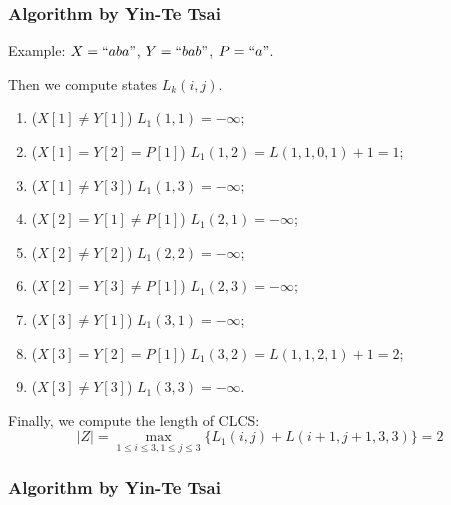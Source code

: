 \documentclass[10pt]{beamer}
\begin{document}
\begin{frame}
  \frametitle{Algorithm by Yin-Te Tsai}
Example: $X=``aba"$, $Y=``bab"$, $P=``a"$.

Then we compute states $L_k(i,j)$.

\begin{enumerate}
	\item<2-> ($X[1]\neq Y[1]$) $L_{1}(1,1) = -\infty$;
	\item<3-> ($X[1]=Y[2]=P[1]$) $L_{1}(1,2)=L(1,1,0,1) + 1 = 1$;
	\item<4-> ($X[1]\neq Y[3]$) $L_{1}(1,3)=-\infty$;
	\item<5-> ($X[2]=Y[1]\neq P[1]$) $L_{1}(2,1) = -\infty$;
	\item<6-> ($X[2]\neq Y[2]$) $L_{1}(2,2)=-\infty$;
	\item<7-> ($X[2]=Y[3]\neq P[1]$) $L_{1}(2,3)=-\infty$;
	\item<8-> ($X[3]\neq Y[1]$) $L_{1}(3,1)=-\infty$;
	\item<9-> ($X[3]=Y[2]=P[1]$) $L_{1}(3,2) = L(1,1,2,1) +1 = 2$;
	\item<10-> ($X[3]\neq Y[3]$) $L_{1}(3,3)=-\infty$.
\end{enumerate}

\pause\pause\pause\pause\pause\pause\pause\pause\pause\pause

Finally, we compute the length of CLCS: 
\[|Z| = \max_{1\le i\le 3, 1\le j\le 3} \{L_{1}(i,j)+L(i+1, j+1, 3,3)\}=2\]

\end{frame}

\begin{frame}
  \frametitle{Algorithm by Yin-Te Tsai}
  
\end{frame}
\end{document}
